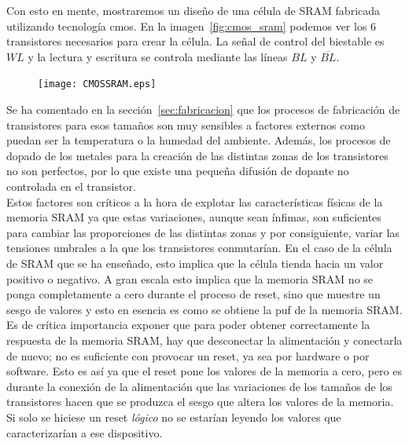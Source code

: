 \documentclass[spanish]{template/minim}
\begin{document}
Con esto en mente, mostraremos un diseño de una célula de SRAM fabricada utilizando tecnología \gls{cmos}. En la imagen~\ref{fig:cmos_sram} podemos ver los 6 transistores necesarios para crear la célula. La señal de control del biestable es $WL$ y la lectura y escritura se controla mediante las líneas $BL$ y $\overline{BL}$.\\

\begin{figure}[H]
    \centering
    \texttt{[image: CMOSSRAM.eps]}
\end{figure}

Se ha comentado en la sección~\ref{sec:fabricacion} que los procesos de fabricación de transistores para esos tamaños son muy sensibles a factores externos como puedan ser la temperatura o la humedad del ambiente. Además, los procesos de dopado de los metales para la creación de las distintas zonas de los transistores no son perfectos, por lo que existe una pequeña difusión de dopante no controlada en el transistor.\\

Estos factores son críticos a la hora de explotar las características físicas de la memoria SRAM ya que estas variaciones, aunque sean ínfimas, son suficientes para cambiar las proporciones de las distintas zonas y por consiguiente, variar las tensiones umbrales a la que los transistores conmutarían. En el caso de la célula de SRAM que se ha enseñado, esto implica que la célula tienda hacia un valor positivo o negativo. A gran escala esto implica que la memoria SRAM no se ponga completamente a cero durante el proceso de reset, sino que muestre un sesgo de valores y esto en esencia es como se obtiene la \gls{puf} de la memoria SRAM.\\

Es de crítica importancia exponer que para poder obtener correctamente la respuesta de la memoria SRAM, hay que desconectar la alimentación y conectarla de nuevo; no es suficiente con provocar un reset, ya sea por hardware o por software. Esto es así ya que el reset pone los valores de la memoria a cero, pero es durante la conexión de la alimentación que las variaciones de los tamaños de los transistores hacen que se produzca el sesgo que altera los valores de la memoria. Si solo se hiciese un reset \textit{lógico} no se estarían leyendo los valores que caracterizarían a ese dispositivo.\\
\end{document}

